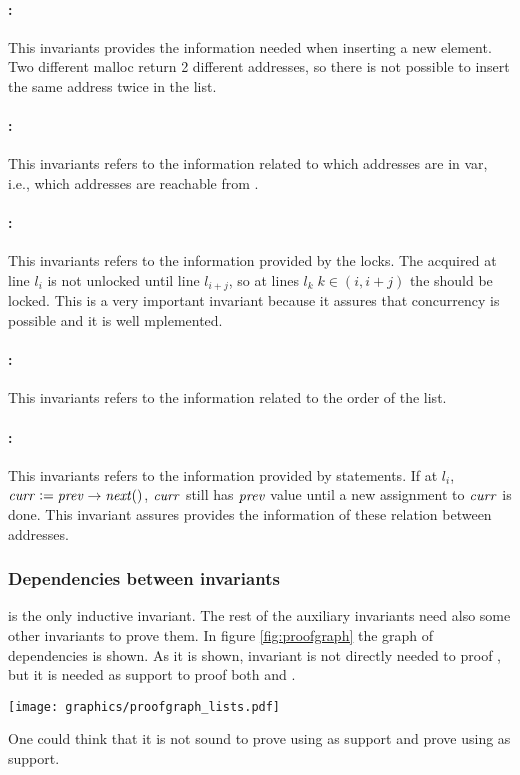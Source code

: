\paragraph{\invDisjoint:}
This invariants provides the information needed when inserting a new element.
%
Two different malloc return 2 different addresses, so there is not possible to insert the same address twice in the list.
%
\paragraph{\invRegion:}
This invariants refers to the information related to which addresses are in \region var, i.e., which addresses are reachable from \head.
%
\paragraph{\invLock:}
This invariants refers to the information provided by the locks. 
%
The \fLock acquired at line $l_i$ is not unlocked until line $l_{i+j}$, so at lines $l_{k}\; k\in(i,i+j)$ the \fLock should be locked.
%
This is a very important invariant because it assures that concurrency is possible and it is well mplemented.
%
\paragraph{\invOrder:}
This invariants refers to the information related to the order of the list. 
%
\paragraph{\invNext:}
This invariants refers to the information provided by \fNext statements. 
%
If at $l_i$, $\mathit{curr} := \mathit{prev}\to\mathit{next}()$,  $\mathit{curr}$ still has $\mathit{prev}$ value until a new assignment to $\mathit{curr}$ is done.
%
This invariant assures provides the information of these relation between addresses.

\subsubsection{Dependencies between invariants}
\invOrder is the only inductive invariant. 
%
The rest of the auxiliary invariants need also some other invariants to prove them.
%
In figure \ref{fig:proofgraph} the graph of dependencies is shown.
%
As it is shown, \invDisjoint invariant is not directly needed to proof \invPreserve, but it is needed as support to proof both \invNext and \invRegion. 

\begin{center}
\texttt{[image: graphics/proofgraph\_lists.pdf]}
\label{fig:proofgraph}
\end{center}

One could think that it is not sound to prove \invLock using \invRegion as support and prove \invRegion using \invLock as support.
%
